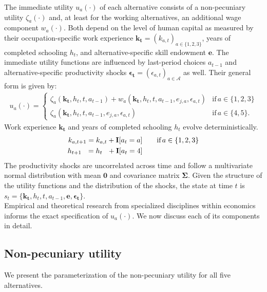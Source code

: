 \noindent The immediate utility $u_a(\cdot)$ of each alternative consists of a non-pecuniary utility $\zeta_a(\cdot)$ and, at least for the working alternatives, an additional wage component $w_a(\cdot)$. Both depend on the level of human capital as measured by their occupation-specific work experience $\bm{k_t} = \left(k_{a,t}\right)_{a\in\{1, 2, 3\}}$, years of completed schooling $h_t$, and alternative-specific skill endowment $\bm{e}$. The immediate utility functions are influenced by last-period choices $a_{t -1}$ and alternative-specific productivity shocks $\bm{\epsilon_t} = \left(\epsilon_{a,t}\right)_{a\in\mathcal{A}}$ as well. Their general form is given by:
%
\begin{align*}
u_a(\cdot) =
\begin{cases}
    \zeta_a(\bm{k_t}, h_t, t, a_{t -1})  + w_a(\bm{k_t}, h_t, t, a_{t -1}, e_{j, a}, \epsilon_{a,t})                & \text{if}\, a \in \{1, 2, 3\}  \\
    \zeta_a(\bm{k_t}, h_t, t, a_{t-1}, e_{j,a}, \epsilon_{a,t})                                                  &  \text{if}\, a \in \{4, 5\}.
\end{cases}
\end{align*}
%
Work experience $\bm{k_t}$  and years of completed schooling $h_t$ evolve deterministically.
%
\begin{align*}
	k_{a,t+1} = k_{a,t} + {\textbf{I}}[a_t = a]  & \qquad \text{if}\, a \in \{1, 2, 3\} \\
	h_{t + 1\phantom{,a}} = h_{t\phantom{,a}} +   {\textbf{I}}[a_t = 4]  & \qquad
\end{align*}
%
\noindent The productivity shocks are uncorrelated across time and follow a multivariate normal distribution with mean $\bm{0}$ and covariance matrix $\bm{\Sigma}$. Given the structure of the utility functions and the distribution of the shocks, the state at time $t$ is $s_t = \{\bm{k_t}, h_t, t, a_{t -1}, \bm{e},\bm{\epsilon_t}\}$.\\

\noindent Empirical and theoretical research from specialized disciplines within economics informs the exact specification of $u_a(\cdot)$. We now discuss each of its components in detail.
\subsection{Non-pecuniary utility}
We present the parameterization of the non-pecuniary utility for all five alternatives.
